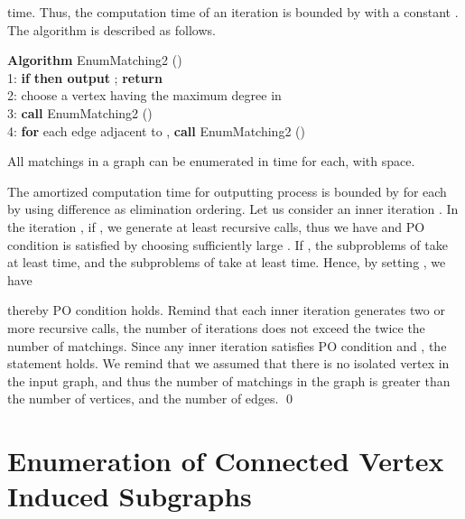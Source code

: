 \documentclass{llncs}
\begin{document}
\vspace{-1mm}

\vspace{-3mm}

\noindent
time.
Thus, the computation time of an iteration is bounded by 
 with a constant .
The algorithm is described as follows.

\begin{tabbing}
{\bf Algorithm} EnumMatching2 ()\\
1: {\bf if}  {\bf then output} ; {\bf return}\\
2: choose a vertex  having the maximum degree in \\
3: {\bf call} EnumMatching2 ()\\
4: {\bf for} each edge  adjacent to ,
 {\bf call} EnumMatching2 ()
\end{tabbing}


\begin{theorem}\label{match}
All matchings in a graph can be enumerated in  time for each,
 with  space.
\end{theorem}

\proof
The amortized computation time for outputting process is
 bounded by  for each by using difference as elimination ordering.
Let us consider an inner iteration .
In the iteration , if , we generate at least 
 recursive calls, thus we have  and PO
 condition is satisfied by choosing sufficiently large .
If , the subproblems of  take 
 at least  time, and the subproblems of 
 take at least  time.
Hence, by setting , we have 

\vspace{-1mm}
 
\vspace{-3mm}

\noindent
 thereby PO condition holds.
Remind that each inner iteration generates two or more recursive calls, 
 the number of iterations does not exceed the twice the number of matchings.
Since any inner iteration satisfies PO condition and
 , the statement holds.
We remind that we assumed that there is no isolated vertex in the
 input graph, and thus the number of matchings in the graph is 
 greater than the number of vertices, and the number of edges.
\qed 


\vspace{-2mm}
\section{Enumeration of Connected Vertex Induced Subgraphs}\label{sec:CIS}
\vspace{-2mm}
\end{document}
